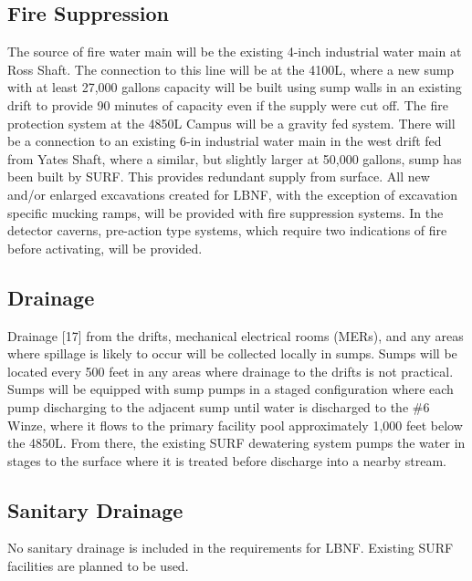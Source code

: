 \subsection{Fire Suppression}
\label{sec:fscf-und-fire-supp}

The source of fire water main will be the existing 4-inch industrial water main at Ross Shaft. The connection to this line will be at the 4100L, where a new sump with at least 27,000 gallons capacity will be built using sump walls in an existing drift to provide 90 minutes of capacity even if the supply were cut off. The fire protection system at the 4850L Campus will be a gravity fed system. There will be a connection to an existing 6-in industrial water main in the west drift fed from Yates Shaft, where a similar, but slightly larger at 50,000 gallons, sump has been built by SURF. This provides redundant supply from surface.  All new and/or enlarged excavations created for LBNF, with the exception of excavation specific mucking ramps, will be provided with fire suppression systems.  In the detector caverns, pre-action type systems, which require two indications of fire before activating, will be provided.


\subsection{Drainage}
\label{sec:fscf-und-drain}

Drainage [17] from the drifts, mechanical electrical rooms (MERs), and any areas where spillage is likely to occur will be collected locally in sumps. Sumps will be located every 500 feet in any areas where drainage to the drifts is not practical. Sumps will be equipped with sump pumps in a staged configuration where each pump discharging to the adjacent sump until water is discharged to the \#6 Winze, where it flows to the primary facility pool approximately 1,000 feet below the 4850L. From there, the existing SURF dewatering system pumps the water in stages to the surface where it is treated before discharge into a nearby stream.

\subsection{Sanitary Drainage}
\label{sec:fscf-und-san-drain}

No sanitary drainage is included in the requirements for LBNF. Existing SURF facilities are planned to be used.

